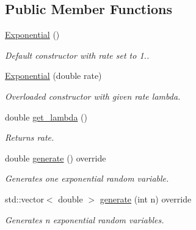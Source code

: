 \subsection*{Public Member Functions}
\begin{DoxyCompactItemize}
\item 
\mbox{\label{class_exponential_abc75eaef5b5f89656c4aa406aceb3c27}} 
\hyperlink{class_exponential_abc75eaef5b5f89656c4aa406aceb3c27}{Exponential} ()
\begin{DoxyCompactList}\small\item\em Default constructor with rate set to 1.. \end{DoxyCompactList}\item 
\mbox{\label{class_exponential_a32dd612030caf5924c498a73f1fc72e8}} 
\hyperlink{class_exponential_a32dd612030caf5924c498a73f1fc72e8}{Exponential} (double rate)
\begin{DoxyCompactList}\small\item\em Overloaded constructor with given rate lambda. \end{DoxyCompactList}\item 
\mbox{\label{class_exponential_adf6d38352839ea9d7a15b2b98ed98a76}} 
double \hyperlink{class_exponential_adf6d38352839ea9d7a15b2b98ed98a76}{get\+\_\+lambda} ()
\begin{DoxyCompactList}\small\item\em Returns rate. \end{DoxyCompactList}\item 
\mbox{\label{class_exponential_ac7846dc0581e84750960825ad9ce4946}} 
double \hyperlink{class_exponential_ac7846dc0581e84750960825ad9ce4946}{generate} () override
\begin{DoxyCompactList}\small\item\em Generates one exponential random variable. \end{DoxyCompactList}\item 
\mbox{\label{class_exponential_a10a4143f519e73772be2e766cda5bfea}} 
std\+::vector$<$ double $>$ \hyperlink{class_exponential_a10a4143f519e73772be2e766cda5bfea}{generate} (int n) override
\begin{DoxyCompactList}\small\item\em Generates n exponential random variables. \end{DoxyCompactList}\end{DoxyCompactItemize}
